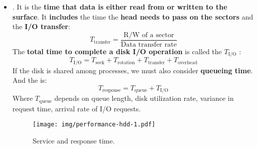 \begin{itemize}
    \item {}. It is the \textbf{time that data is either read from or written to the surface}. It \textbf{includes} the time the \textbf{head needs to pass on the sectors} and the \textbf{I/O transfer}:
    \begin{equation}
        T_{\text{transfer}} = \dfrac{\text{R/W of a sector}}{\text{Data transfer rate}}
    \end{equation}
    The \textbf{total time to complete a disk I/O operation} is called the $T_{\text{I/O}}$ :
    \begin{equation}
        T_{\text{I/O}} = T_{\text{seek}} + T_{\text{rotation}} + T_{\text{transfer}} + T_{\text{overhead}}
    \end{equation}
    If the disk is shared among processes, we must also consider \textbf{queueing time}. And the  is:
    \begin{equation}
        T_{\text{response}} = T_{\text{queue}} + T_{\text{I/O}}
    \end{equation}
    Where $T_{\text{queue}}$ depends on queue length, disk utilization rate, variance in request time, arrival rate of I/O requests.
    \newpage
    \begin{figure}[!htp]
        \centering
        \texttt{[image: img/performance-hdd-1.pdf]}
        \caption{Service and response time.}
    \end{figure}
\end{itemize}

